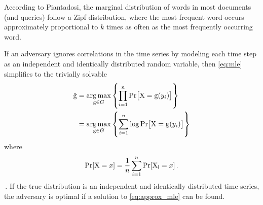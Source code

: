 \documentclass[ ../main.tex]{subfiles}
\begin{document}
According to Piantadosi, the marginal distribution of words in most documents (and queries) follow a Zipf distribution\cite{ref10}, where the most frequent word occurs approximately proportional to $k$ times as often as the \kth most frequently occurring word.

If an adversary ignores correlations in the time series by modeling each time step as an independent and identically distributed random variable, then \cref{eq:mle} simplifies to the trivially solvable 
\begin{align}
\label{eq:approx_mle}
    \operatorname{\hat{g}}
        &= \operatorname*{arg\,max}_{\operatorname{g} \in G}
        \left\{
            \prod_{i=1}^{n} \Pr\!\left[
                \mathrm{X} = \operatorname{g}(y_i)\right]
        \right\}\\
        &= \operatorname*{arg\,max}_{\operatorname{g} \in G}
        \left\{
            \sum_{i=1}^{n} \log \Pr\!\left[
                \mathrm{X} = \operatorname{g}(y_i)\right]
        \right\}
\end{align}
where
\[
    \Pr[\mathrm{X} = x] = \frac{1}{n} \sum_{i=1}^{n} \Pr[\mathrm{X_i} = x]\,.
\]\,.
If the true distribution is an independent and identically distributed time series, the adversary is optimal if a solution to \cref{eq:approx_mle} can be found.
\end{document}
